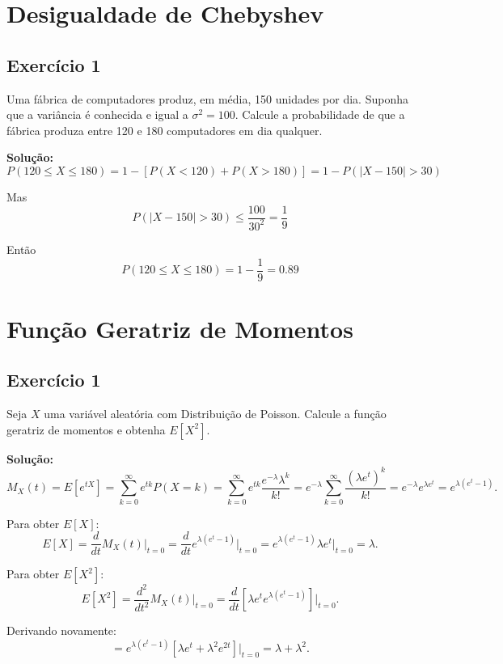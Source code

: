 \documentclass{article}
\begin{document}
\section{Desigualdade de Chebyshev}
\subsection{Exercício 1}
Uma fábrica de computadores produz, em média, 150 unidades por dia. Suponha que a variância é conhecida e igual a $\sigma^2 = 100$. Calcule a probabilidade de que a fábrica produza entre 120 e 180 computadores em dia qualquer.

\vspace{0.5cm}
\textbf{Solução:} 
    $$
    P(120 \leq X \leq 180) 
    = 1 - [P(X < 120) + P(X > 180)] 
    = 1 - P(|X - 150| > 30)
    $$

Mas
    $$
    P(|X - 150| > 30) \leq \frac{100}{30^2} = \frac{1}{9}
    $$

Então
    $$
    P(120 \leq X \leq 180) 
    = 1 - \frac{1}{9} = 0.89
    $$

\section{Função Geratriz de Momentos}
\subsection{Exercício 1}
Seja $X$ uma variável aleatória com Distribuição de Poisson. Calcule a função geratriz de momentos e obtenha $E[X^2]$.

\vspace{0.5cm}
\textbf{Solução:} 
    $$
    M_X(t) = E[e^{tX}] = \sum_{k=0}^{\infty} e^{tk} P(X=k) = \sum_{k=0}^{\infty} e^{tk} \frac{e^{-\lambda} \lambda^k}{k!} 
    = e^{-\lambda} \sum_{k=0}^{\infty} \frac{(\lambda e^t)^k}{k!} 
    = e^{-\lambda} e^{\lambda e^t} 
    = e^{\lambda (e^t - 1)}.
    $$

Para obter $E[X]$:
    $$
    E[X] = \frac{d}{dt} M_X(t) \bigg|_{t=0} 
    = \frac{d}{dt} e^{\lambda (e^t - 1)} \bigg|_{t=0} 
    = e^{\lambda (e^t - 1)} \lambda e^t \bigg|_{t=0} 
    = \lambda.
    $$

Para obter $E[X^2]$:
    $$
    E[X^2] = \frac{d^2}{dt^2} M_X(t) \bigg|_{t=0}
    = \frac{d}{dt} \left[ \lambda e^t e^{\lambda (e^t - 1)} \right] \bigg|_{t=0}.
    $$

Derivando novamente:
    $$
    = e^{\lambda (e^t - 1)} 
    \left[
    \lambda e^t + \lambda^2 e^{2t}
    \right] 
    \bigg|_{t=0}
    = \lambda + \lambda^2.
    $$
\end{document}
